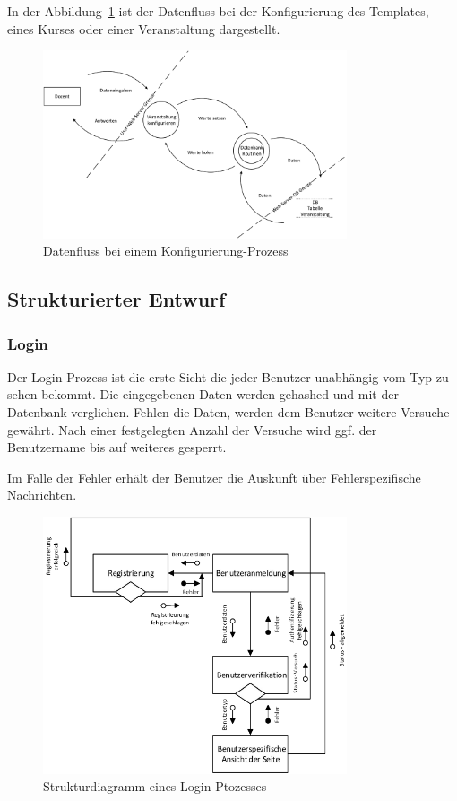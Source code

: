 \begin{appendix}
  
  In der Abbildung~\ref{fig:config} ist der Datenfluss bei der Konfigurierung des Templates, eines Kurses oder einer Veranstaltung dargestellt.
  
      \begin{figure}[ht]
    \centering
    \includegraphics[width=0.8\textwidth]{./img/dfd_config}
    \caption{Datenfluss bei einem Konfigurierung-Prozess}
    \label{fig:config}
    \end{figure}
    \clearpage
    
	
	\subsection{Strukturierter Entwurf} 
	\subsubsection{Login}
	Der Login-Prozess ist die erste Sicht die jeder Benutzer unabhängig vom Typ zu sehen bekommt. Die eingegebenen Daten werden gehashed und mit der Datenbank verglichen. Fehlen die Daten, werden dem Benutzer weitere Versuche gewährt. Nach einer festgelegten Anzahl der Versuche wird ggf. der Benutzername bis auf weiteres gesperrt.
	
	Im Falle der Fehler erhält der Benutzer die Auskunft über Fehlerspezifische Nachrichten.
	
	\begin{figure}[H]
		\centering
		\includegraphics[width=0.8\textwidth]{./img/sd_login_process}
		\caption{Strukturdiagramm eines Login-Ptozesses}
		\label{fig:sd_login_process}
	\end{figure}
	

\end{appendix}
